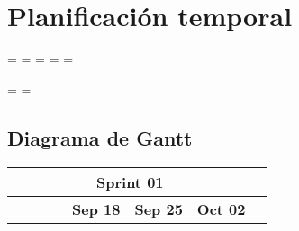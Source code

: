 \chapter{Planificación temporal}
\label{cap:planificacion}

\newpage
\paperwidth=\pdfpageheight
\paperheight=\pdfpagewidth
\pdfpageheight=\paperheight
\pdfpagewidth=\paperwidth
\headwidth=\textheight

\begingroup
    \vsize=\textwidth
    \hsize=\textheight
    \section{Diagrama de Gantt}
    \label{sec:gantt}

    \begin{longtable}[c]{llclllllllllllllllll}
        \hline
        \multicolumn{19}{c}{\cellcolor[HTML]{8EA9D8}\textbf{Sprint 01}}                                                                                                                                                                                                                                                                                                                                                                                                                                                                                                                                                                                                                                                                                                                                                                                                                                                                &  \\ \hline
        \endfirsthead
        \endhead
        \multicolumn{1}{|c|}{\cellcolor[HTML]{FFFFFF}}                                                                          & \multicolumn{1}{c|}{\cellcolor[HTML]{FFFFFF}}                                  & \multicolumn{1}{c|}{\cellcolor[HTML]{FFFFFF}}                                    & \multicolumn{1}{c|}{\cellcolor[HTML]{FFFFFF}}                                        & \multicolumn{5}{c|}{\cellcolor[HTML]{FFFFFF}\textbf{Sep 18}}                                                                                                            & \multicolumn{5}{c|}{\cellcolor[HTML]{FFFFFF}\textbf{Sep 25}}                                                                                                            & \multicolumn{5}{c|}{\cellcolor[HTML]{FFFFFF}\textbf{Oct 02}}                                                                                                                          &  \\ \cline{5-19}

\end{longtable}
